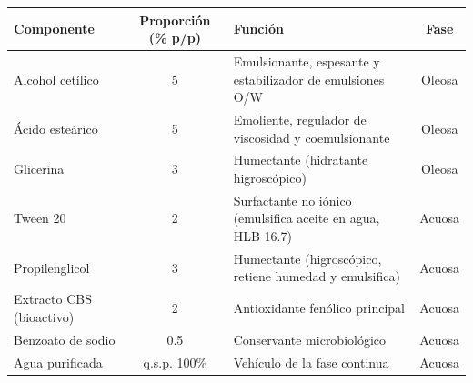 \documentclass{article}
\begin{document}
\large  %

\begin{table}[h!]
\centering
\begin{tabular}{>{\raggedright\arraybackslash}p{3.5cm} c >{\raggedright\arraybackslash}p{5cm} c}
\toprule
\textbf{Componente} & \textbf{Proporción (\% p/p)} & \textbf{Función} & \textbf{Fase} \\
\midrule
Alcohol cetílico & 5 & Emulsionante, espesante y estabilizador de emulsiones O/W & Oleosa \\
Ácido esteárico & 5 & Emoliente, regulador de viscosidad y coemulsionante & Oleosa \\
Glicerina & 3 & Humectante (hidratante higroscópico) & Oleosa \\
Tween 20 & 2 & Surfactante no iónico (emulsifica aceite en agua, HLB 16.7) & Acuosa \\
Propilenglicol & 3 & Humectante (higroscópico, retiene humedad y emulsifica) & Acuosa \\
Extracto CBS (bioactivo) & 2 & Antioxidante fenólico principal & Acuosa \\
Benzoato de sodio & 0.5 & Conservante microbiológico & Acuosa \\
Agua purificada & q.s.p. 100\% & Vehículo de la fase continua & Acuosa \\
\bottomrule
\end{tabular}
\end{table}
\end{document}
